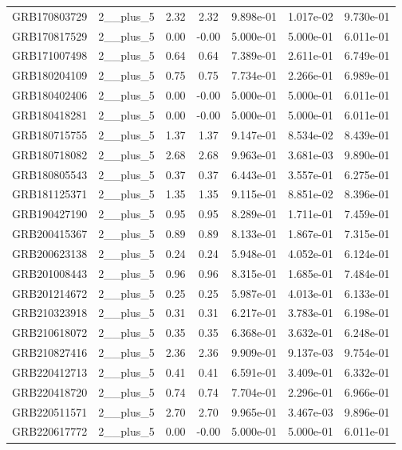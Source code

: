 \documentclass[12pt]{article}
\begin{document}
\begin{table}[h!]
{\begin{tabular}{l c c c c c c}
GRB170803729 & 2__plus_5 & 2.32 & 2.32 & 9.898e-01 & 1.017e-02 & 9.730e-01 \\
GRB170817529 & 2__plus_5 & 0.00 & -0.00 & 5.000e-01 & 5.000e-01 & 6.011e-01 \\
GRB171007498 & 2__plus_5 & 0.64 & 0.64 & 7.389e-01 & 2.611e-01 & 6.749e-01 \\
GRB180204109 & 2__plus_5 & 0.75 & 0.75 & 7.734e-01 & 2.266e-01 & 6.989e-01 \\
GRB180402406 & 2__plus_5 & 0.00 & -0.00 & 5.000e-01 & 5.000e-01 & 6.011e-01 \\
GRB180418281 & 2__plus_5 & 0.00 & -0.00 & 5.000e-01 & 5.000e-01 & 6.011e-01 \\
GRB180715755 & 2__plus_5 & 1.37 & 1.37 & 9.147e-01 & 8.534e-02 & 8.439e-01 \\
GRB180718082 & 2__plus_5 & 2.68 & 2.68 & 9.963e-01 & 3.681e-03 & 9.890e-01 \\
GRB180805543 & 2__plus_5 & 0.37 & 0.37 & 6.443e-01 & 3.557e-01 & 6.275e-01 \\
GRB181125371 & 2__plus_5 & 1.35 & 1.35 & 9.115e-01 & 8.851e-02 & 8.396e-01 \\
GRB190427190 & 2__plus_5 & 0.95 & 0.95 & 8.289e-01 & 1.711e-01 & 7.459e-01 \\
GRB200415367 & 2__plus_5 & 0.89 & 0.89 & 8.133e-01 & 1.867e-01 & 7.315e-01 \\
GRB200623138 & 2__plus_5 & 0.24 & 0.24 & 5.948e-01 & 4.052e-01 & 6.124e-01 \\
GRB201008443 & 2__plus_5 & 0.96 & 0.96 & 8.315e-01 & 1.685e-01 & 7.484e-01 \\
GRB201214672 & 2__plus_5 & 0.25 & 0.25 & 5.987e-01 & 4.013e-01 & 6.133e-01 \\
GRB210323918 & 2__plus_5 & 0.31 & 0.31 & 6.217e-01 & 3.783e-01 & 6.198e-01 \\
GRB210618072 & 2__plus_5 & 0.35 & 0.35 & 6.368e-01 & 3.632e-01 & 6.248e-01 \\
GRB210827416 & 2__plus_5 & 2.36 & 2.36 & 9.909e-01 & 9.137e-03 & 9.754e-01 \\
GRB220412713 & 2__plus_5 & 0.41 & 0.41 & 6.591e-01 & 3.409e-01 & 6.332e-01 \\
GRB220418720 & 2__plus_5 & 0.74 & 0.74 & 7.704e-01 & 2.296e-01 & 6.966e-01 \\
GRB220511571 & 2__plus_5 & 2.70 & 2.70 & 9.965e-01 & 3.467e-03 & 9.896e-01 \\
GRB220617772 & 2__plus_5 & 0.00 & -0.00 & 5.000e-01 & 5.000e-01 & 6.011e-01 \\

\end{tabular}}
\end{table}
\end{document}

